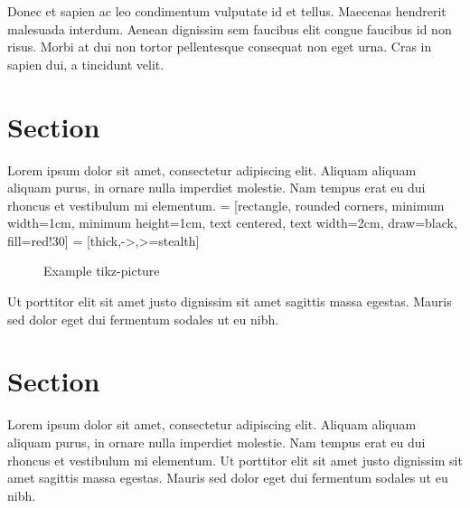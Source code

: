 Donec et sapien ac leo condimentum vulputate id et tellus. Maecenas hendrerit malesuada interdum. Aenean dignissim sem faucibus elit congue faucibus id non risus. Morbi at dui non tortor pellentesque consequat non eget urna. Cras in sapien dui, a tincidunt velit.

\section{Section}

Lorem ipsum dolor sit amet, consectetur adipiscing elit. Aliquam aliquam aliquam purus, in ornare nulla imperdiet molestie. Nam tempus erat eu dui rhoncus et vestibulum mi elementum. 
 = [rectangle, rounded corners, minimum width=1cm, minimum height=1cm, text centered, text width=2cm, draw=black, fill=red!30]
 = [thick,->,>=stealth]
\begin{figure}[htbp]
\centering
{}
\caption{Example tikz-picture}
\label{fig:tikz}
\end{figure}
Ut porttitor elit sit amet justo dignissim sit amet sagittis massa egestas. Mauris sed dolor eget dui fermentum sodales ut eu nibh. 

\section{Section}

Lorem ipsum dolor sit amet, consectetur adipiscing elit. Aliquam aliquam aliquam purus, in ornare nulla imperdiet molestie. Nam tempus erat eu dui rhoncus et vestibulum mi elementum. Ut porttitor elit sit amet justo dignissim sit amet sagittis massa egestas. Mauris sed dolor eget dui fermentum sodales ut eu nibh. 


